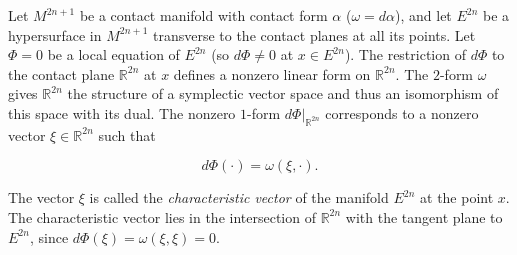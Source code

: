Let $M^{2n+1}$ be a contact manifold with contact form $\alpha$ ($\omega = d\alpha$), and let $E^{2n}$ be a hypersurface in $M^{2n+1}$ transverse to the contact planes at all its points. Let $\Phi = 0$ be a local equation of $E^{2n}$ (so $d\Phi \neq 0$ at $x \in E^{2n}$). The restriction of $d\Phi$ to the contact plane $\mathbb{R}^{2n}$ at $x$ defines a nonzero linear form on $\mathbb{R}^{2n}$. The $2$-form $\omega$ gives $\mathbb{R}^{2n}$ the structure of a symplectic vector space and thus an isomorphism of this space with its dual. The nonzero $1$-form $d\Phi|_{\mathbb{R}^{2n}}$ corresponds to a nonzero vector $\xi \in \mathbb{R}^{2n}$ such that

$$d\Phi(\cdot) = \omega(\xi, \cdot).$$

The vector $\xi$ is called the \textit{characteristic vector} of the manifold $E^{2n}$ at the point $x$. The characteristic vector lies in the intersection of $\mathbb{R}^{2n}$ with the tangent plane to $E^{2n}$, since $d\Phi(\xi) = \omega(\xi,\xi) = 0$.
